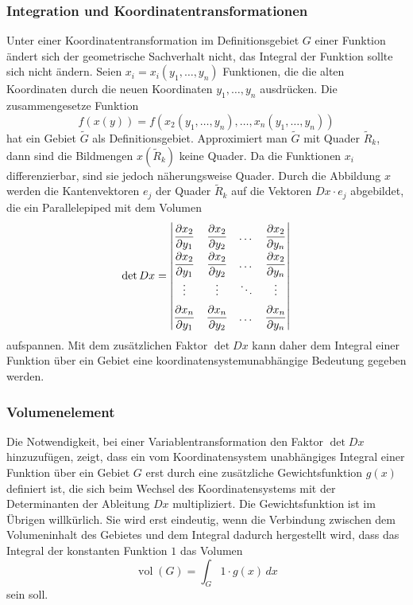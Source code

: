 \subsubsection{Integration und Koordinatentransformationen}
Unter einer Koordinatentransformation im Definitionsgebiet 
$G$ einer Funktion ändert sich der geometrische Sachverhalt nicht,
das Integral der Funktion sollte sich nicht ändern.
Seien $x_i=x_i(y_1,\dots,y_n)$ Funktionen, die die alten Koordinaten
durch die neuen Koordinaten $y_1,\dots,y_n$ ausdrücken.
Die zusammengesetze Funktion
\[
f(x(y))
=
f(x_2(y_1,\dots,y_n),\dots,x_n(y_1,\dots,y_n))
\]
hat ein Gebiet $\tilde{G}$ als Definitionsgebiet.
Approximiert man $\tilde{G}$ mit Quader $\tilde{R}_k$, dann sind
die Bildmengen $x(\tilde{R}_k)$ keine Quader.
Da die Funktionen $x_i$ differenzierbar, sind sie jedoch näherungsweise
Quader.
Durch die Abbildung $x$ werden die Kantenvektoren $e_j$ der Quader 
$\tilde{R}_k$ auf die Vektoren $Dx\cdot e_j$ abgebildet, die ein
Parallelepiped mit dem Volumen
\[
\det Dx
=
\left|
\renewcommand{\arraystretch}{1.9}
\begin{matrix}
\displaystyle
\frac{\partial x_2}{\partial y_1}
&
\displaystyle
\frac{\partial x_2}{\partial y_2}
&\dots&
\displaystyle
\frac{\partial x_2}{\partial y_n}
\\
\displaystyle
\frac{\partial x_2}{\partial y_1}
&
\displaystyle
\frac{\partial x_2}{\partial y_2}
&\dots&
\displaystyle
\frac{\partial x_2}{\partial y_n}
\\
\vdots&\vdots&\ddots&\vdots\\
\displaystyle
\frac{\partial x_n}{\partial y_1}
&
\displaystyle
\frac{\partial x_n}{\partial y_2}
&\dots&
\displaystyle
\frac{\partial x_n}{\partial y_n}
\end{matrix}
\right|
\]
aufspannen.
Mit dem zusätzlichen Faktor $\det Dx$ kann daher dem Integral einer Funktion
über ein Gebiet eine koordinatensystemunabhängige Bedeutung gegeben werden.

%
%
\subsubsection{Volumenelement}
Die Notwendigkeit, bei einer Variablentransformation den Faktor
$\det Dx$ hinzuzufügen, zeigt, dass ein vom Koordinatensystem unabhängiges
Integral einer Funktion über ein Gebiet $G$ erst durch eine zusätzliche
Gewichtsfunktion $g(x)$ definiert ist, die sich beim Wechsel des
Koordinatensystems mit der Determinanten der Ableitung $Dx$ multipliziert.
Die Gewichtsfunktion ist im Übrigen willkürlich.
Sie wird erst eindeutig,
wenn die Verbindung zwischen dem Volumeninhalt des Gebietes und 
dem Integral dadurch hergestellt wird, dass das Integral der konstanten
Funktion $1$ das Volumen
\[
\operatorname{vol}(G)
=
\int_G 1\cdot g(x)\,dx
\]
sein soll.

